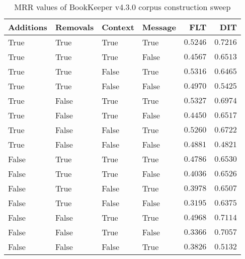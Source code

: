 
\begin{table}
\begin{spacing}{1.2}
\centering
\caption{MRR values of BookKeeper v4.3.0 corpus construction sweep}
\label{table:bookkeeper_corpus_sweep}
\vspace{0.2em}
\begin{tabular}{llll|rr}
\toprule
Additions & Removals & Context & Message & FLT &        DIT \\
\midrule
     True &     True &    True &    True &         $0.5246$ & $\bm{0.7216}$ \\
     \myrowcolor True &     True &    True &   False &         $0.4567$ &      $0.6513$ \\
     True &     True &   False &    True &         $0.5316$ &      $0.6465$ \\
     True &     True &   False &   False &         $0.4970$ &      $0.5425$ \\
     True &    False &    True &    True &    $\bm{0.5327}$ &      $0.6974$ \\
     True &    False &    True &   False &         $0.4450$ &      $0.6517$ \\
     True &    False &   False &    True &         $0.5260$ &      $0.6722$ \\
     True &    False &   False &   False &         $0.4881$ &      $0.4821$ \\
    False &     True &    True &    True &         $0.4786$ &      $0.6530$ \\
    False &     True &    True &   False &         $0.4036$ &      $0.6526$ \\
    False &     True &   False &    True &         $0.3978$ &      $0.6507$ \\
    False &     True &   False &   False &         $0.3195$ &      $0.6375$ \\
    False &    False &    True &    True &         $0.4968$ &      $0.7114$ \\
    False &    False &    True &   False &         $0.3366$ &      $0.7057$ \\
    False &    False &   False &    True &         $0.3826$ &      $0.5132$ \\
\bottomrule
\end{tabular}

\end{spacing}
\end{table}
